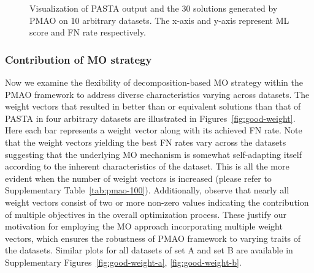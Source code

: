 \documentclass[a4paper,fleqn, review]{cas-dc}
\begin{document}
\begin{figure}[pos=!htbp, align=\centering, width=17cm]
\begin{adjustwidth}{-1cm}{}
		
	\caption{Visualization of PASTA output and the 30 solutions generated by PMAO on 10 arbitrary datasets. The x-axis and y-axis represent ML score and FN rate respectively.}
	\label{fig:ml-fn}
	\end{adjustwidth}
\end{figure}

\subsubsection{Contribution of MO strategy}
Now we examine the flexibility of decomposition-based MO strategy within the PMAO framework to address diverse characteristics varying across datasets. The weight vectors that resulted in better than or equivalent solutions than that of PASTA in four arbitrary datasets are illustrated in Figures~\ref{fig:good-weight}. Here each bar represents a weight vector along with its achieved FN rate.  Note that the weight vectors yielding the best FN rates vary across the datasets suggesting that the underlying MO mechanism is somewhat self-adapting itself according to the inherent characteristics of the dataset. This is all the more evident when the number of weight vectors is increased (please refer to Supplementary Table~\ref{tab:pmao-100}). Additionally, observe that nearly all weight vectors consist of two or more non-zero values indicating the contribution of multiple objectives in the overall optimization process. These justify our motivation for employing the MO approach incorporating multiple weight vectors, which ensures the robustness of PMAO framework to varying traits of the datasets. Similar plots for all datasets of set A and set B are available in Supplementary Figures~\ref{fig:good-weight-a}, \ref{fig:good-weight-b}.
\end{document}
